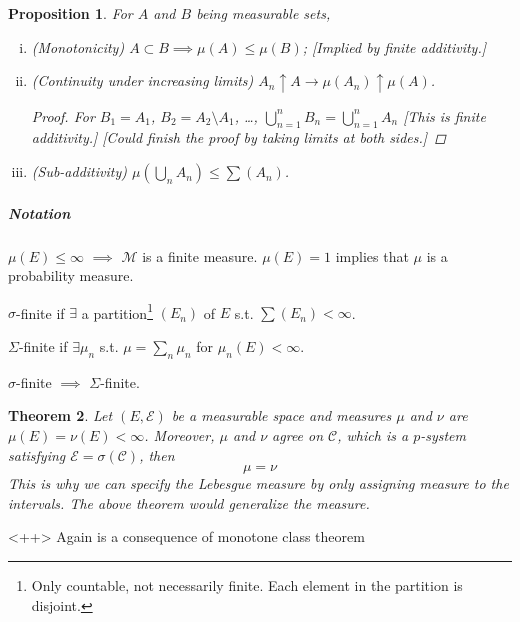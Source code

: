\documentclass[11pt]{article}
\newcommand{\m}{\mathcal}
\newtheorem{theorem}{Theorem}[subsection]
\newtheorem{proposition}[theorem]{Proposition}
\begin{document}
\begin{proposition}
  For $A$ and $B$ being measurable sets, 
  \begin{enumerate}[(i)]
    \item (Monotonicity) $A \subset B \implies \mu(A) \le \mu (B)$;  [Implied by
      finite additivity.]
    \item (Continuity under increasing limits) $A_n \uparrow A \to \mu (A_n)
      \uparrow \mu(A)$. 

      \begin{proof}
        For $B_1 = A_1$, $B_2 = A_2 \setminus A_1$, \dots, $\bigcup _{n=1}^n B_n
        = \bigcup _{n=1}^n A_n$ [This is finite additivity.] 
        \label{Homework} [Could finish the proof by taking limits at both
        sides.]
      \end{proof}
    \item (Sub-additivity) $\mu (\bigcup _ n A_n) \le \sum (A_n)$.
  \end{enumerate}
\end{proposition}

\subparagraph{Notation}
$\mu(E) \le \infty$ $\implies $ $\mathcal M$ is a finite measure.
$\mu(E) = 1$ implies that $\mu$ is a probability measure. 

$\sigma$-finite if $\exists $ a partition\footnote{Only countable, not
necessarily finite. Each element in the partition is disjoint.} $(E_n)$ of $E$ s.t. $\sum (E_n) < \infty$. 

$\Sigma$-finite if $\exists \mu_n$ s.t. $\mu = \sum _n \mu _n $ for $\mu_n(E) <
\infty$. 

$\sigma$-finite $\implies$ $\Sigma$-finite.

\begin{theorem}
  Let $(E, \mathcal E)$ be a measurable space and measures $\mu $ and $\nu$ are
  $\mu(E) = \nu(E) < \infty$. Moreover, $\mu$ and $\nu$ agree on $\mathcal C$,
  which is a $p$-system satisfying $\mathcal E = \sigma (\m C)$, then 
  \[
    \mu = \nu
  \]
  This is why we can specify the Lebesgue measure by only assigning measure to
  the intervals. The above theorem would generalize the measure. 
  \label{thm:}
\end{theorem}<++>
Again is a consequence of monotone class theorem
\end{document}
